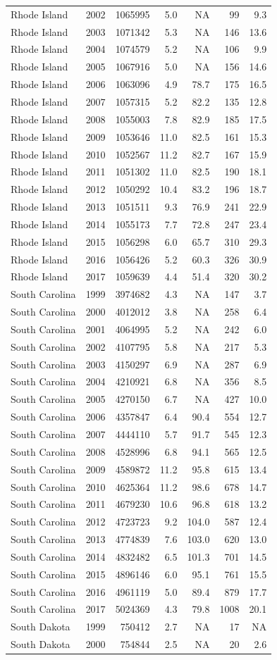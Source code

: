 \documentclass[
]{article}
\begin{document}
\begin{longtable}[]{@{}lrrrrrr@{}}
Rhode Island & 2002 & 1065995 & 5.0 & NA & 99 & 9.3\tabularnewline
Rhode Island & 2003 & 1071342 & 5.3 & NA & 146 & 13.6\tabularnewline
Rhode Island & 2004 & 1074579 & 5.2 & NA & 106 & 9.9\tabularnewline
Rhode Island & 2005 & 1067916 & 5.0 & NA & 156 & 14.6\tabularnewline
Rhode Island & 2006 & 1063096 & 4.9 & 78.7 & 175 & 16.5\tabularnewline
Rhode Island & 2007 & 1057315 & 5.2 & 82.2 & 135 & 12.8\tabularnewline
Rhode Island & 2008 & 1055003 & 7.8 & 82.9 & 185 & 17.5\tabularnewline
Rhode Island & 2009 & 1053646 & 11.0 & 82.5 & 161 & 15.3\tabularnewline
Rhode Island & 2010 & 1052567 & 11.2 & 82.7 & 167 & 15.9\tabularnewline
Rhode Island & 2011 & 1051302 & 11.0 & 82.5 & 190 & 18.1\tabularnewline
Rhode Island & 2012 & 1050292 & 10.4 & 83.2 & 196 & 18.7\tabularnewline
Rhode Island & 2013 & 1051511 & 9.3 & 76.9 & 241 & 22.9\tabularnewline
Rhode Island & 2014 & 1055173 & 7.7 & 72.8 & 247 & 23.4\tabularnewline
Rhode Island & 2015 & 1056298 & 6.0 & 65.7 & 310 & 29.3\tabularnewline
Rhode Island & 2016 & 1056426 & 5.2 & 60.3 & 326 & 30.9\tabularnewline
Rhode Island & 2017 & 1059639 & 4.4 & 51.4 & 320 & 30.2\tabularnewline
South Carolina & 1999 & 3974682 & 4.3 & NA & 147 & 3.7\tabularnewline
South Carolina & 2000 & 4012012 & 3.8 & NA & 258 & 6.4\tabularnewline
South Carolina & 2001 & 4064995 & 5.2 & NA & 242 & 6.0\tabularnewline
South Carolina & 2002 & 4107795 & 5.8 & NA & 217 & 5.3\tabularnewline
South Carolina & 2003 & 4150297 & 6.9 & NA & 287 & 6.9\tabularnewline
South Carolina & 2004 & 4210921 & 6.8 & NA & 356 & 8.5\tabularnewline
South Carolina & 2005 & 4270150 & 6.7 & NA & 427 & 10.0\tabularnewline
South Carolina & 2006 & 4357847 & 6.4 & 90.4 & 554 & 12.7\tabularnewline
South Carolina & 2007 & 4444110 & 5.7 & 91.7 & 545 & 12.3\tabularnewline
South Carolina & 2008 & 4528996 & 6.8 & 94.1 & 565 & 12.5\tabularnewline
South Carolina & 2009 & 4589872 & 11.2 & 95.8 & 615 &
13.4\tabularnewline
South Carolina & 2010 & 4625364 & 11.2 & 98.6 & 678 &
14.7\tabularnewline
South Carolina & 2011 & 4679230 & 10.6 & 96.8 & 618 &
13.2\tabularnewline
South Carolina & 2012 & 4723723 & 9.2 & 104.0 & 587 &
12.4\tabularnewline
South Carolina & 2013 & 4774839 & 7.6 & 103.0 & 620 &
13.0\tabularnewline
South Carolina & 2014 & 4832482 & 6.5 & 101.3 & 701 &
14.5\tabularnewline
South Carolina & 2015 & 4896146 & 6.0 & 95.1 & 761 & 15.5\tabularnewline
South Carolina & 2016 & 4961119 & 5.0 & 89.4 & 879 & 17.7\tabularnewline
South Carolina & 2017 & 5024369 & 4.3 & 79.8 & 1008 &
20.1\tabularnewline
South Dakota & 1999 & 750412 & 2.7 & NA & 17 & NA\tabularnewline
South Dakota & 2000 & 754844 & 2.5 & NA & 20 & 2.6\tabularnewline

\end{longtable}
\end{document}
